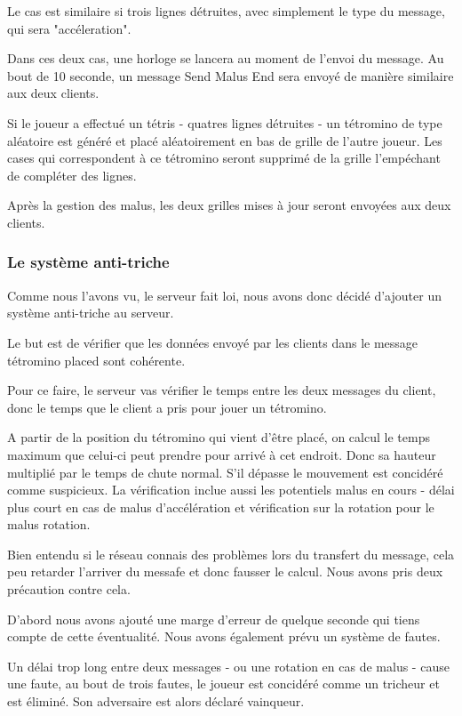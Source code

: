 \documentclass[a4paper, 12pt]{article}
\begin{document}
			Le cas est similaire si trois lignes détruites, avec simplement le type du message, qui sera "accéleration".

			Dans ces deux cas, une horloge se lancera au moment de l'envoi du message. Au bout de 10 seconde, un message Send Malus End sera envoyé de manière similaire aux deux clients.

			Si le joueur a effectué un tétris - quatres lignes détruites - un tétromino de type aléatoire est généré et placé aléatoirement en bas de grille de l'autre joueur. Les cases qui correspondent à ce tétromino seront supprimé de la grille l'empéchant de compléter des lignes.

			Après la gestion des malus, les deux grilles mises à jour seront envoyées aux deux clients.
				
		\subsubsection{Le système anti-triche}
			Comme nous l'avons vu, le serveur fait loi, nous avons donc décidé d'ajouter un système anti-triche au serveur.

			Le but est de vérifier que les données envoyé par les clients dans le message tétromino placed sont cohérente. 

			Pour ce faire, le serveur vas vérifier le temps entre les deux messages du client, donc le temps que le client a pris pour jouer un tétromino.

			A partir de la position du tétromino qui vient d'être placé, on calcul le temps maximum que celui-ci peut prendre pour arrivé à cet endroit. Donc sa hauteur multiplié par le temps de chute normal.
			S'il dépasse le mouvement est concidéré comme suspicieux.
			La vérification inclue aussi les potentiels malus en cours - délai plus court en cas de malus d'accélération et vérification sur la rotation pour le malus rotation.

			Bien entendu si le réseau connais des problèmes lors du transfert du message, cela peu retarder l'arriver du messafe et donc fausser le calcul. Nous avons pris deux précaution contre cela. 

			D'abord nous avons ajouté une marge d'erreur de quelque seconde qui tiens compte de cette éventualité. Nous avons également prévu un système de fautes.

			Un délai trop long entre deux messages - ou une rotation en cas de malus - cause une faute, au bout de trois fautes, le joueur est concidéré comme un tricheur et est éliminé. Son adversaire est alors déclaré vainqueur.
\end{document}
